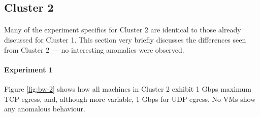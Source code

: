 \documentclass[a4paper,10pt]{article}
\begin{document}
\subsection*{Cluster 2}
\paragraph{} Many of the experiment specifics for Cluster 2 are identical to those already discussed for Cluster 1. This section very briefly discusses the differences seen from Cluster 2 --- no interesting anomalies were observed.

\paragraph{Experiment 1} Figure \ref{fig:bw-2} shows how all machines in Cluster 2 exhibit 1 Gbps maximum TCP egress, and, although more variable, 1 Gbps for UDP egress. No VMs show any anomalous behaviour.
\end{document}

